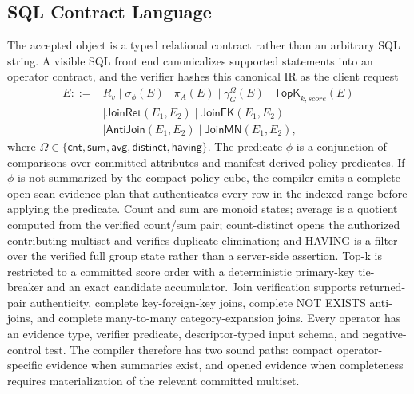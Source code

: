 \documentclass[conference]{IEEEtran}
\begin{document}
\subsection{SQL Contract Language}
The accepted object is a typed relational contract rather than an arbitrary SQL string. A visible SQL front end canonicalizes supported statements into an operator contract, and the verifier hashes this canonical IR as the client request
\begin{equation}
\begin{array}{rl}
E ::= & R_v \mid \sigma_\phi(E) \mid \pi_A(E) \mid \gamma_G^\Omega(E) \mid \mathsf{TopK}_{k,score}(E) \\
&\mid \mathsf{JoinRet}(E_1,E_2) \mid \mathsf{JoinFK}(E_1,E_2) \\
&\mid \mathsf{AntiJoin}(E_1,E_2) \mid \mathsf{JoinMN}(E_1,E_2),
\end{array}
\end{equation}
where $\Omega\in\{\mathsf{cnt},\mathsf{sum},\mathsf{avg},\mathsf{distinct},\mathsf{having}\}$.
The predicate $\phi$ is a conjunction of comparisons over committed attributes and manifest-derived policy predicates. If $\phi$ is not summarized by the compact policy cube, the compiler emits a complete open-scan evidence plan that authenticates every row in the indexed range before applying the predicate. Count and sum are monoid states; average is a quotient computed from the verified count/sum pair; count-distinct opens the authorized contributing multiset and verifies duplicate elimination; and HAVING is a filter over the verified full group state rather than a server-side assertion. Top-k is restricted to a committed score order with a deterministic primary-key tie-breaker and an exact candidate accumulator. Join verification supports returned-pair authenticity, complete key-foreign-key joins, complete NOT EXISTS anti-joins, and complete many-to-many category-expansion joins. Every operator has an evidence type, verifier predicate, descriptor-typed input schema, and negative-control test. The compiler therefore has two sound paths: compact operator-specific evidence when summaries exist, and opened evidence when completeness requires materialization of the relevant committed multiset.
\end{document}
